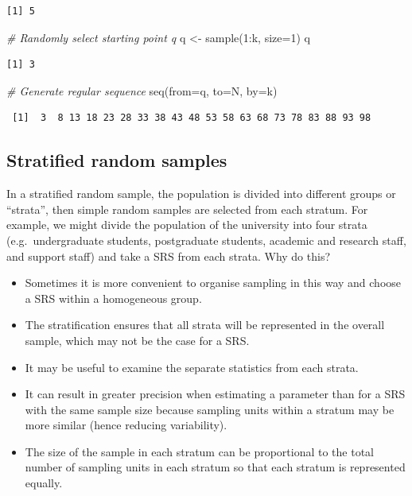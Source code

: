 \documentclass[
  oneside]{krantz}
\newenvironment{Shaded}{\begin{snugshade}}{\end{snugshade}}
\newcommand{\AttributeTok}[1]{\textcolor[rgb]{0.77,0.63,0.00}{#1}}
\newcommand{\CommentTok}[1]{\textcolor[rgb]{0.56,0.35,0.01}{\textit{#1}}}
\newcommand{\DecValTok}[1]{\textcolor[rgb]{0.00,0.00,0.81}{#1}}
\newcommand{\FunctionTok}[1]{\textcolor[rgb]{0.00,0.00,0.00}{#1}}
\newcommand{\NormalTok}[1]{#1}
\newcommand{\OtherTok}[1]{\textcolor[rgb]{0.56,0.35,0.01}{#1}}
\newcommand{\SpecialCharTok}[1]{\textcolor[rgb]{0.00,0.00,0.00}{#1}}
\begin{document}
\begin{verbatim}
[1] 5
\end{verbatim}

\begin{Shaded}
\begin{Highlighting}[]
\CommentTok{\# Randomly select starting point q}
\NormalTok{q }\OtherTok{\textless{}{-}} \FunctionTok{sample}\NormalTok{(}\DecValTok{1}\SpecialCharTok{:}\NormalTok{k, }\AttributeTok{size=}\DecValTok{1}\NormalTok{)}
\NormalTok{q}
\end{Highlighting}
\end{Shaded}

\begin{verbatim}
[1] 3
\end{verbatim}

\begin{Shaded}
\begin{Highlighting}[]
\CommentTok{\# Generate regular sequence}
\FunctionTok{seq}\NormalTok{(}\AttributeTok{from=}\NormalTok{q, }\AttributeTok{to=}\NormalTok{N, }\AttributeTok{by=}\NormalTok{k)}
\end{Highlighting}
\end{Shaded}

\begin{verbatim}
 [1]  3  8 13 18 23 28 33 38 43 48 53 58 63 68 73 78 83 88 93 98
\end{verbatim}

\hypertarget{stratified-random-samples}{%
\subsection{Stratified random samples}\label{stratified-random-samples}}

In a stratified random sample, the population is divided into different groups or ``strata'', then simple random samples are selected from each stratum. For example, we might divide the population of the university into four strata (e.g.~undergraduate students, postgraduate students, academic and research staff, and support staff) and take a SRS from each strata. Why do this?

\begin{itemize}
\item
  Sometimes it is more convenient to organise sampling in this way and choose a SRS within a homogeneous group.
\item
  The stratification ensures that all strata will be represented in the overall sample, which may not be the case for a SRS.
\item
  It may be useful to examine the separate statistics from each strata.
\item
  It can result in greater precision when estimating a parameter than for a SRS with the same sample size because sampling units within a stratum may be more similar (hence reducing variability).
\item
  The size of the sample in each stratum can be proportional to the total number of sampling units in each stratum so that each stratum is represented equally.
\end{itemize}
\end{document}
